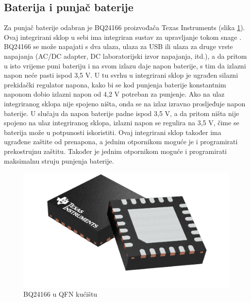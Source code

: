\subsection{Baterija i punjač baterije}
Za punjač baterije odabran je BQ24166 proizvođača Texas Instruments (slika \ref{slk:BQ24166}). Ovaj integrirani sklop u sebi ima integriran sustav za upravljanje tokom snage \cite{ti:bq24166}. BQ24166 se može napajati s dva ulaza, ulaza za USB ili ulaza za druge vrste napajanja (AC/DC adapter, DC laboratorijski izvor napajanja, itd.), a da pritom u isto vrijeme puni bateriju i na svom izlazu daje napon baterije, s tim da izlazni napon neće pasti ispod 3,5 V. U tu svrhu u integrirani sklop je ugrađen silazni prekidački regulator napona, kako bi se kod punjenja baterije konstantnim naponom dobio izlazni napon od 4,2 V potreban za punjenje. Ako na ulaz integriranog sklopa nije spojeno ništa, onda se na izlaz izravno prosljeđuje napon baterije. U slučaju da napon baterije padne ispod 3,5 V, a da pritom ništa nije spojeno na ulaz integriranog sklopa, izlazni napon se regulira na 3,5 V, čime se baterija može u potpunosti iskoristiti. Ovaj integrirani sklop također ima ugrađene zaštite od prenapona, a jednim otpornikom moguće je i programirati prekostrujnu zaštitu. Također je jednim otpornikom moguće i programirati maksimalnu struju punjenja baterije.
\begin{figure}[!hbtp]
    \centering
    \includegraphics[width = 6 cm]{Figures/bq24166.png}
    \caption{BQ24166 u QFN kućištu \cite{ti:bq24166}}
    \label{slk:BQ24166}
\end{figure}

